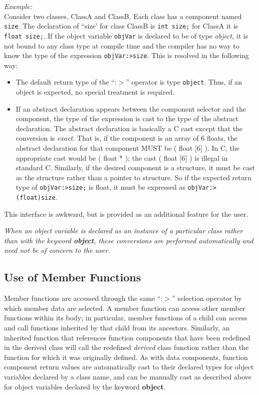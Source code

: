 {\em Example:}\\
Consider two classes, ClassA and ClassB.  Each class has a component named
{\tt size}.  The declaration of ``size' for class ClassB is {\tt int size;}
for ClassA it is {\tt float size;}.  If the object variable {\tt objVar} is
declared to be of type
{\em object},
it is not bound to any class type at compile time and the compiler
has no way to know the type of the expression
{\tt objVar:>size}.  This is resolved in the following way:

\begin{itemize}
\item
The default return type of the ``:$>$'' operator is type {\tt object}.  Thus, if
an object is expected, no special treatment is required.
\item
If an abstract declaration appears between the component selector and
the component, the type of the expression is cast to the type of the
abstract declaration.  The abstract declaration is basically a C cast except
that the conversion is {\em exact}.
That is, if the component is an array of 6 floats, the abstract declaration
for that component MUST be ( float [6] ).  In C, the appropriate
cast would be ( float * ); the cast ( float [6] ) is illegal in standard C.
Similarly, if the desired component is a structure, it must be cast as the
structure rather than a pointer to structure.  So if the expected return
type of {\tt objVar:>size;} is float, it must be expressed as
{\tt objVar:>(float)size}.
\end{itemize}

This interface is awkward, but
is provided as an additional feature for the user.

{\em When an object variable is declared as an instance of a particular class
rather than with the keyword
{\bf object},
these conversions are performed automatically and need not be of concern to
the user.}

\subsection{Use of Member Functions}
Member functions are accessed through the same ``:$>$'' selection operator by
which member data are selected.  A member function can access other member
functions within its body; in particular, member functions of a child
can access and call functions inherited by that child from its ancestors.
Similarly, an inherited function that references function components that
have been redefined in the derived class will call the redefined
{\em derived}
class function rather than the function for which it was originally
defined.  As with data components, function component return values
are automatically cast to their declared types for object variables
declared by a class name, and can be manually cast as described above
for object variables declared by the keyword {\bf object}.
